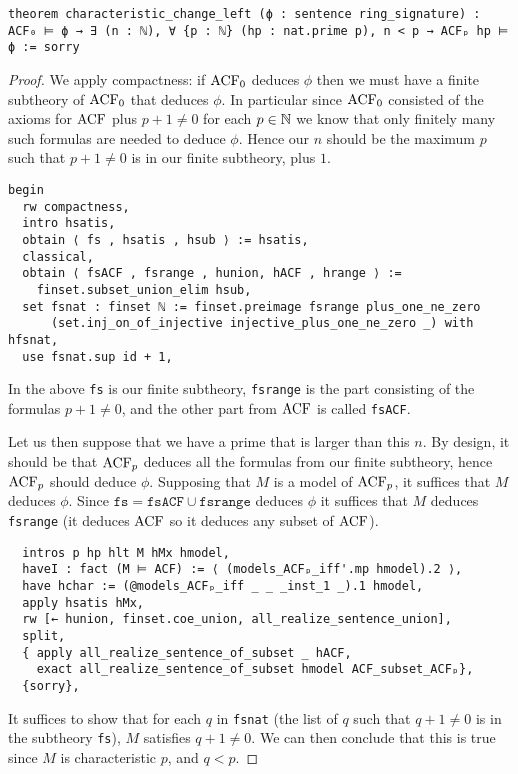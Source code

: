 \begin{lstlisting}
theorem characteristic_change_left (ϕ : sentence ring_signature) :
ACF₀ ⊨ ϕ → ∃ (n : ℕ), ∀ {p : ℕ} (hp : nat.prime p), n < p → ACFₚ hp ⊨ ϕ := sorry \end{lstlisting}

\begin{proof}
We apply compactness:
if $\operatorname{ACF}_{0}$ deduces $\phi$ then we must have a finite subtheory of
$\operatorname{ACF}_{0}$ that deduces $\phi$.
In particular since $\operatorname{ACF}_{0}$ consisted of the axioms for $\operatorname{ACF}$ plus
$p + 1 \ne 0$ for each $p \in \mathbb{N}$ we know that only finitely many
such formulas are needed to deduce $\phi$.
Hence our $n$ should be the maximum $p$ such that $p + 1 \ne 0$
is in our finite subtheory, plus $1$.
\begin{lstlisting}
begin
  rw compactness,
  intro hsatis,
  obtain ⟨ fs , hsatis , hsub ⟩ := hsatis,
  classical,
  obtain ⟨ fsACF , fsrange , hunion, hACF , hrange ⟩ :=
    finset.subset_union_elim hsub,
  set fsnat : finset ℕ := finset.preimage fsrange plus_one_ne_zero
      (set.inj_on_of_injective injective_plus_one_ne_zero _) with hfsnat,
  use fsnat.sup id + 1, \end{lstlisting}

In the above \texttt{fs} is our finite subtheory,
\texttt{fsrange} is the part consisting of the formulas $p + 1 \ne 0$,
and the other part from $\operatorname{ACF}$ is called \texttt{fsACF}.

Let us then suppose that we have a prime that is larger than this $n$.
By design,
it should be that $\operatorname{ACF}_{p}$ deduces all the formulas from
our finite subtheory, hence $\operatorname{ACF}_{p}$ should deduce $\phi$.
Supposing that $M$ is a model of $\operatorname{ACF}_{p}$,
it suffices that $M$ deduces $\phi$.
Since $\texttt{fs} = \texttt{fsACF} \cup \texttt{fsrange}$
deduces $\phi$ it suffices that $M$ deduces \texttt{fsrange}
(it deduces $\operatorname{ACF}$ so it deduces any subset of $\operatorname{ACF}$).

\begin{lstlisting}
  intros p hp hlt M hMx hmodel,
  haveI : fact (M ⊨ ACF) := ⟨ (models_ACFₚ_iff'.mp hmodel).2 ⟩,
  have hchar := (@models_ACFₚ_iff _ _ _inst_1 _).1 hmodel,
  apply hsatis hMx,
  rw [← hunion, finset.coe_union, all_realize_sentence_union],
  split,
  { apply all_realize_sentence_of_subset _ hACF,
    exact all_realize_sentence_of_subset hmodel ACF_subset_ACFₚ},
  {sorry}, \end{lstlisting}

It suffices to show that for each $q$ in \texttt{fsnat}
(the list of $q$ such that $q + 1 \ne 0$ is in the subtheory \texttt{fs}),
$M$ satisfies $q + 1 \ne 0$.
We can then conclude that this is true since $M$ is characteristic $p$,
and $q < p$.
\end{proof}

